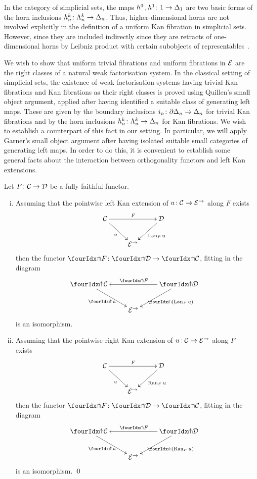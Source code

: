 \documentclass[reqno,10pt,a4paper,oneside]{amsart}
\begin{document}
 \begin{remark} In the category of simplicial sets, the maps $h^0 \, , h^1 \co 1 \to \Delta_1$ are two basic forms of the horn
 inclusions $h^k_n \co \Lambda^k_n \to \Delta_n$.  Thus, higher-dimensional horns are not involved
 explicitly in the definition of a uniform Kan fibration in simplicial sets. However, 
  since they are included indirectly since they are  retracts of one-dimensional horns by Leibniz product 
  with certain subobjects of representables~\cite{joyal-quaderns}.
  \end{remark} 
 
We wish to show that uniform trivial fibrations and uniform fibrations in $\cal{E}$ are the
right classes of a natural weak factorisation system. In the classical setting of 
simplicial sets, the existence of weak factorisation systems having trivial Kan fibrations
and Kan fibrations as their right classes is proved using Quillen's small object argument,
applied after having identified a suitable class of generating left maps. These are given
by the boundary inclusions $i_n \co \partial \Delta_n \to \Delta_n$ for trivial Kan fibrations
and by the horn inclusions $h^k_n \co \Lambda^k_n \to \Delta_n$ for Kan fibrations. 
We wish to establish a counterpart of  this fact in our setting. In particular,
we will apply Garner's small object argument after having isolated suitable
small categories of generating left maps. In order to do this, it is convenient
to establish some general facts about the interaction between orthogonality 
functors and left Kan extensions. 

\begin{proposition} Let $F \co \cal{C} \to \cal{D}$ be a fully faithful functor. 
\label{kan-extension-closure}
\begin{enumerate}[(i)]
\item Assuming that the pointwise left Kan extension of 
$u \co \cal{C} \to \catE^{\to}$ along $F$ exists
\[
\xymatrix{
  \cal{C}
  \ar[dr]_{u}
  \ar[rr]^{F}
&&
  \cal{D}
  \ar[dl]^{\Lan_F u}
\\&
  \catE^{\to}
}
\]
then the functor $\liftr{F} \co \liftr{\cal{D}} \to \liftr{\cal{C}}$,  fitting in the diagram
\[
\xymatrix{
  \liftr{\cal{C}}
  \ar[dr]_{\liftr{u}}
&&
  \liftr{\cal{D}}
  \ar[ll]_{\liftr{F}}
  \ar[dl]^{\liftr{(\Lan_F u)}}
\\&
  \catE^{\to}
}
\]
is an isomorphism.
\item Assuming that the pointwise right Kan extension of 
$u \co \cal{C} \to \catE^{\to}$ along $F$ exists
\[
\xymatrix{
  \cal{C}
  \ar[dr]_{u}
  \ar[rr]^{F}
&&
  \cal{D}
  \ar[dl]^{\Ran_F u}
\\&
  \catE^{\to}
}
\]
then the functor $\liftl{F} \co \liftl{\cal{D}} \to \liftl{\cal{C}}$, fitting in the diagram
\[
\xymatrix{
  \liftl{\cal{C}}
  \ar[dr]_{\liftl{u}}
&&
  \liftl{\cal{D}}
  \ar[ll]_{\liftl{F}}
  \ar[dl]^{\liftl{(\Ran_F u)}}
\\&
  \catE^{\to}
}
\]
is an isomorphism. \qed
\end{enumerate}
\end{proposition}
\end{document}
